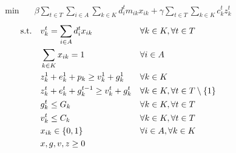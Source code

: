 \begin{align}
    \min\quad       & \beta \sum_{t \in T} \sum_{i \in A} \sum_{k \in K}{d^t_i m_{ik} x_{ik}} + \gamma \sum_{t \in T} \sum_{k \in K}{c_k^t z_k^t}
    \label{eq:statico-obj}
\end{align}
\vspace*{-6mm}
\begin{align}
    \text{s.t.\quad}
    \label{eq:statico-c1}
    & v_k^t = \sum_{i \in A}{d^t_i x_{ik}}          &   & \forall k \in K, \forall t \in T                 \\
    \label{eq:statico-c2}
    & \sum_{k \in K}{x_{ik}} = 1                    &   & \forall i \in A                                  \\
    \label{eq:statico-c3}
    & z_k^1 + e_k^1 + p_k \geq v_k^1 + g_k^1        &   & \forall k \in K                                  \\
    \label{eq:statico-c4}
    & z_k^t + e_k^t + g_k^{t-1} \geq v_k^t + g_k^t  &   & \forall k \in K, \forall t \in T \setminus \{1\} \\
    \label{eq:statico-c5}
    & g_k^t \leq G_k                                &   & \forall k \in K, \forall t \in T                 \\
    \label{eq:statico-c6}
    & v_k^t \leq C_k                                &   & \forall k \in K, \forall t \in T                 \\
    \label{eq:statico-c7}
    & x_{ik} \in \{0,1\}                            &   & \forall i \in A, \forall k \in K                 \\
    \label{eq:statico-c8}
    & x, g, v, z \geq 0                             &   &
\end{align}
